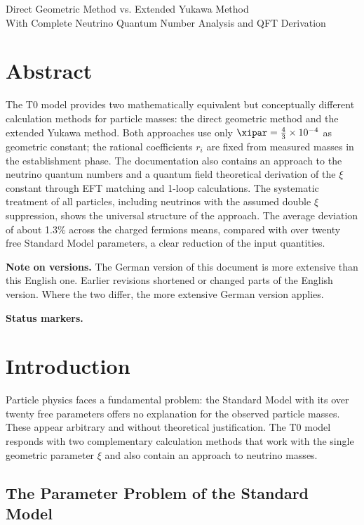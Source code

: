 Direct Geometric Method vs. Extended Yukawa Method \\
	 With Complete Neutrino Quantum Number Analysis and QFT Derivation

\section*{Abstract}
		The T0 model provides two mathematically equivalent but conceptually different calculation methods for particle masses: the direct geometric method and the extended Yukawa method. Both approaches use only $\xipar = \frac{4}{3} \times 10^{-4}$ as geometric constant; the rational coefficients $r_i$ are fixed from measured masses in the establishment phase. The documentation also contains an approach to the neutrino quantum numbers and a quantum field theoretical derivation of the $\xi$ constant through EFT matching and 1-loop calculations. The systematic treatment of all particles, including neutrinos with the assumed double $\xi$ suppression, shows the universal structure of the approach. The average deviation of about 1.3\% across the charged fermions means, compared with over twenty free Standard Model parameters, a clear reduction of the input quantities.

	\medskip\noindent\textbf{Note on versions.} The German version of this document is more extensive than this English one. Earlier revisions shortened or changed parts of the English version. Where the two differ, the more extensive German version applies.


	\medskip\noindent\textbf{Status markers.}
	

	

	\section{Introduction}
	\label{sec:introduction}
	
	Particle physics faces a fundamental problem: the Standard Model with its over twenty free parameters offers no explanation for the observed particle masses. These appear arbitrary and without theoretical justification. The T0 model responds with two complementary calculation methods that work with the single geometric parameter $\xi$ and also contain an approach to neutrino masses.
	
	\subsection{The Parameter Problem of the Standard Model}
	\label{subsec:parameter_problem}
	
